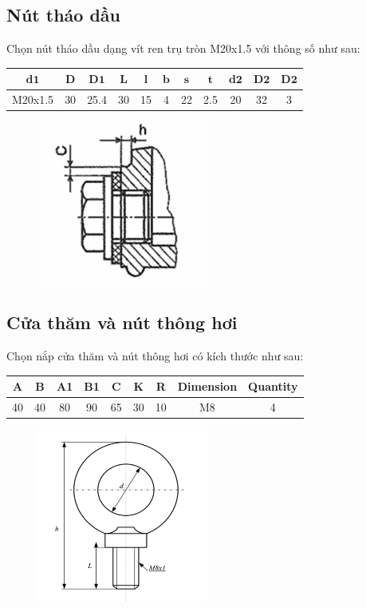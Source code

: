 \subsection{Nút tháo dầu}
Chọn nút tháo dầu dạng vít ren trụ tròn M20x1.5 với thông số như sau:
\begin{table}[H]
    \centering
    \begin{tabular}{|c|c|c|c|c|c|c|c|c|c|c|}
    \hline
    $\mathbf{d1}$ & $\mathbf{D}$ & $\mathbf{D1}$ & $\mathbf{L}$ & $\mathbf{l}$ & $\mathbf{b}$ & $\mathbf{s}$ & $\mathbf{t}$ & $\mathbf{d2}$ & $\mathbf{D2}$ & $\mathbf{D2}$ \\
    \hline
    M20x1.5 & 30 & 25.4 & 30 & 15 & 4 & 22 & 2.5 & 20 & 32 & 3 \\
    \hline
    \end{tabular}
\end{table}
\begin{figure}[H]
    \centering
    \includegraphics[width=0.5\textwidth]{pictures/nut.png}
\end{figure}

\subsection{Cửa thăm và nút thông hơi}
Chọn nắp cửa thăm và nút thông hơi có kích thước như sau:
\begin{center}
\begin{tabular}{|c|c|c|c|c|c|c|c|c|}
\hline
A & B & A1 & B1 & C & K & R & Dimension & Quantity \\
\hline
40 & 40 & 80 & 90 & 65 & 30 & 10 & M8 & 4 \\
\hline
\end{tabular}
\end{center}
\begin{figure}[H]
    \centering
    \includegraphics[width=0.5\textwidth]{pictures/vitvong.png}
\end{figure}
